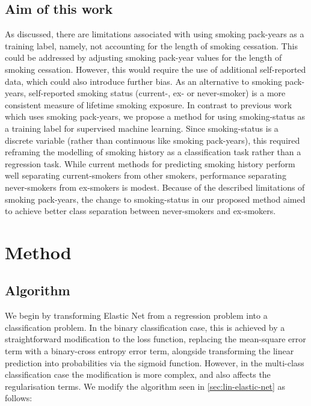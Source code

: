 \documentclass[draft]{article}
\begin{document}
\subsection{Aim of this work}

As discussed, there are limitations associated with using smoking pack-years as a training label, namely, not accounting for the length of smoking cessation. This could be addressed by adjusting smoking pack-year values for the length of smoking cessation. However, this would require the use of additional self-reported data, which could also introduce further bias. As an alternative to smoking pack-years, self-reported smoking status (current-, ex- or never-smoker) is a more consistent measure of lifetime smoking exposure. In contrast to previous work which uses smoking pack-years, we propose a method for using smoking-status as a training label for supervised machine learning. Since smoking-status is a discrete variable (rather than continuous like smoking pack-years), this required reframing the modelling of smoking history as a classification task rather than a regression task. While current methods for predicting smoking history perform well separating current-smokers from other smokers, performance separating never-smokers from ex-smokers is modest. Because of the described limitations of smoking pack-years, the change to smoking-status in our proposed method aimed to achieve better class separation between never-smokers and ex-smokers.


\section{Method}

\subsection{Algorithm} \label{sec:algorithm}
We begin by transforming Elastic Net from a regression problem into a classification problem. In the binary classification case, this is achieved by a straightforward modification to the loss function, replacing the mean-square error term with a binary-cross entropy error term, alongside transforming the linear prediction into probabilities via the sigmoid function. However, in the multi-class classification case the modification is more complex, and also affects the regularisation terms. We modify the algorithm seen in \ref{sec:lin-elastic-net} as follows:
\end{document}
